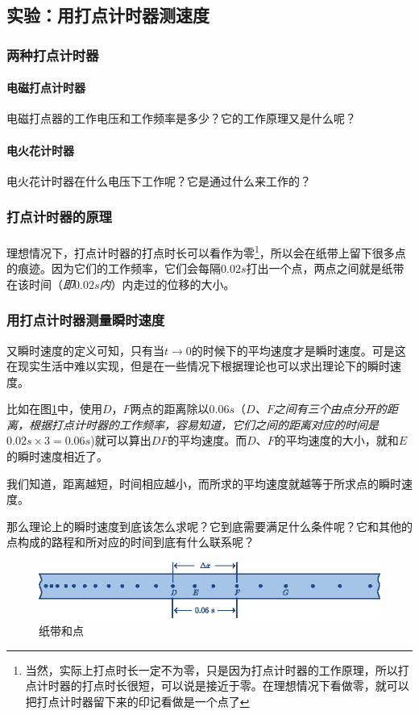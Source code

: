 		\subsection{实验：用打点计时器测速度}
			\subsubsection*{两种打点计时器}
				\paragraph{电磁打点计时器}
					电磁打点器的工作电压和工作频率是多少？它的工作原理又是什么呢？
				\paragraph{电火花计时器}
					电火花计时器在什么电压下工作呢？它是通过什么来工作的？

			\subsubsection*{打点计时器的原理}
				\paragraph{}理想情况下，打点计时器的打点时长可以看作为零\footnote{当然，实际上打点时长一定不为零，只是因为打点计时器的工作原理，所以打点计时器的打点时长很短，可以说是接近于零。在理想情况下看做零，就可以把打点计时器留下来的印记看做是一个点了}，所以会在纸带上留下很多点的痕迹。因为它们的工作频率，它们会每隔$0.02s$打出一个点，两点之间就是纸带在该时间（\emph{即$0.02s$内}）内走过的位移的大小。

			\subsubsection*{用打点计时器测量瞬时速度}
				又瞬时速度的定义可知，只有当$t\to 0$的时候下的平均速度才是瞬时速度。可是这在现实生活中难以实现，但是在一些情况下根据理论也可以求出理论下的瞬时速度。

				比如在图\ref{Pic::纸带和点}中，使用$D$，$F$两点的距离除以$0.06 s$（\emph{$D$、$F$之间有三个由点分开的距离，根据打点计时器的工作频率，容易知道，它们之间的距离对应的时间是$0.02 s\times 3=0.06s$})就可以算出$DF$的平均速度。而$D$、$F$的平均速度的大小，就和$E$的瞬时速度相近了。

				我们知道，距离越短，时间相应越小，而所求的平均速度就越等于所求点的瞬时速度。

				那么理论上的瞬时速度到底该怎么求呢？它到底需要满足什么条件呢？它和其他的点构成的路程和所对应的时间到底有什么联系呢？
				\begin{figure}
					\begin{center}
						\includegraphics[]{PIC/005.eps}
						\caption{纸带和点}
						\label{Pic::纸带和点}
					\end{center}
				\end{figure}

